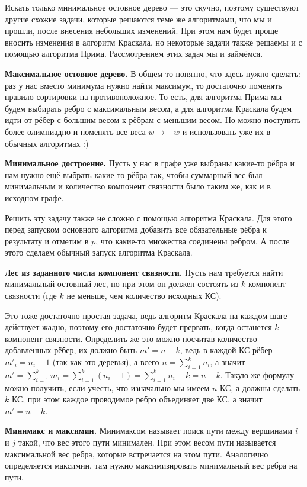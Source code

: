 Искать только минимальное остовное дерево — это скучно, поэтому существуют другие схожие задачи, которые решаются теме же алгоритмами, что мы и прошли, после внесения небольших изменений. При этом нам будет проще вносить изменения в алгоритм Краскала, но некоторые задачи также решаемы и с помощью алгоритма Прима. Рассмотрением этих задач мы и займёмся.

\textbf{Максимальное остовное дерево.} В общем-то понятно, что здесь нужно сделать: раз у нас вместо минимума нужно найти максимум, то достаточно поменять правило сортировки на противоположное. То есть, для алгоритма Прима мы будем выбирать ребро с максимальным весом, а для алгоритма Краскала будем идти от рёбер с большим весом к рёбрам с меньшим весом. Но можно поступить более олимпиадно и поменять все веса $w \to -w$ и использовать уже их в обычных алгоритмах :)

\textbf{Минимальное достроение.} Пусть у нас в графе уже выбраны какие-то рёбра и нам нужно ещё выбрать какие-то рёбра так, чтобы суммарный вес был минимальным и количество компонент связности было таким же, как и в исходном графе.

Решить эту задачу также не сложно с помощью алгоритма Краскала. Для этого перед запуском основного алгоритма добавить все обязательные рёбра к результату и отметим в $p$, что какие-то множества соединены ребром. А после этого сделаем обычный запуск алгоритма Краскала.

\textbf{Лес из заданного числа компонент связности.} Пусть нам требуется найти минимальный остовный лес, но при этом он должен состоять из $k$ компонент связности (где $k$ не меньше, чем количество исходных КС).

Это тоже достаточно простая задача, ведь алгоритм Краскала на каждом шаге действует жадно, поэтому его достаточно будет прервать, когда останется $k$ компонент связности. Определить же это можно посчитав количество добавленных рёбер, их должно быть $m' = n - k$, ведь в каждой КС рёбер $m'_i = n_i - 1$ (так как это деревья), а всего $n = \sum\limits_{i = 1}^{k} n_i$, а значит $m' = \sum\limits_{i = 1}^{k} m_i = \sum\limits_{i = 1}^{k} (n_i - 1) = \sum\limits_{i = 1}^{k} n_i - k = n - k$. Такую же формулу можно получить, если учесть, что изначально мы имеем $n$ КС, а должны сделать $k$ КС, при этом каждое проводимое ребро объединяет две КС, а значит $m' = n - k$.

\textbf{Минимакс и максимин.} Минимаксом называет поиск пути между вершинами $i$ и $j$ такой, что вес этого пути минимален. При этом весом пути называется максимальной вес ребра, которые встречается на этом пути. Аналогично определяется максимин, там нужно максимизировать минимальный вес ребра на пути.


